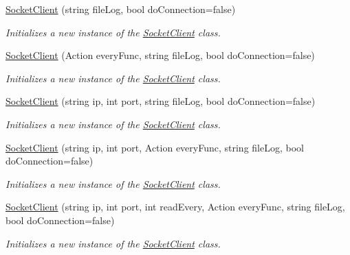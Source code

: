 \begin{DoxyCompactItemize}
\item 
\hyperlink{class_lerp2_a_p_i_1_1_communication_1_1_sockets_1_1_socket_client_a56e84fbccfecedf55e3ba4d5eee6ffc2}{Socket\+Client} (string file\+Log, bool do\+Connection=false)
\begin{DoxyCompactList}\small\item\em Initializes a new instance of the \hyperlink{class_lerp2_a_p_i_1_1_communication_1_1_sockets_1_1_socket_client}{Socket\+Client} class. \end{DoxyCompactList}\item 
\hyperlink{class_lerp2_a_p_i_1_1_communication_1_1_sockets_1_1_socket_client_a1526a744e0cde24ab100f00efbd792dd}{Socket\+Client} (Action every\+Func, string file\+Log, bool do\+Connection=false)
\begin{DoxyCompactList}\small\item\em Initializes a new instance of the \hyperlink{class_lerp2_a_p_i_1_1_communication_1_1_sockets_1_1_socket_client}{Socket\+Client} class. \end{DoxyCompactList}\item 
\hyperlink{class_lerp2_a_p_i_1_1_communication_1_1_sockets_1_1_socket_client_a64e305d0cec95bc38875d874a118110b}{Socket\+Client} (string ip, int port, string file\+Log, bool do\+Connection=false)
\begin{DoxyCompactList}\small\item\em Initializes a new instance of the \hyperlink{class_lerp2_a_p_i_1_1_communication_1_1_sockets_1_1_socket_client}{Socket\+Client} class. \end{DoxyCompactList}\item 
\hyperlink{class_lerp2_a_p_i_1_1_communication_1_1_sockets_1_1_socket_client_a70e0b9026b0186405e32f669cfd46952}{Socket\+Client} (string ip, int port, Action every\+Func, string file\+Log, bool do\+Connection=false)
\begin{DoxyCompactList}\small\item\em Initializes a new instance of the \hyperlink{class_lerp2_a_p_i_1_1_communication_1_1_sockets_1_1_socket_client}{Socket\+Client} class. \end{DoxyCompactList}\item 
\hyperlink{class_lerp2_a_p_i_1_1_communication_1_1_sockets_1_1_socket_client_a0533e1e8f1715491d52cf2f87e7577fa}{Socket\+Client} (string ip, int port, int read\+Every, Action every\+Func, string file\+Log, bool do\+Connection=false)
\begin{DoxyCompactList}\small\item\em Initializes a new instance of the \hyperlink{class_lerp2_a_p_i_1_1_communication_1_1_sockets_1_1_socket_client}{Socket\+Client} class. \end{DoxyCompactList}\item 

\end{DoxyCompactItemize}
